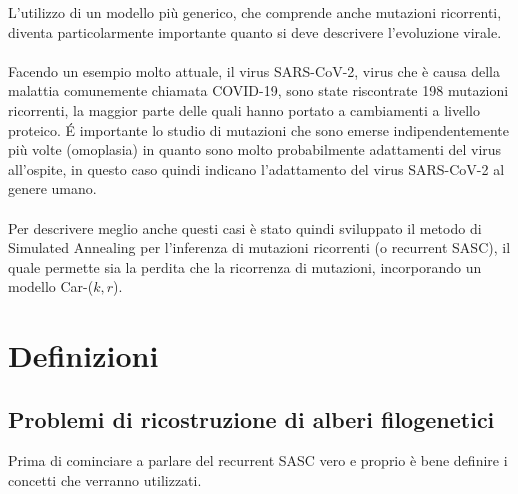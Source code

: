 \documentclass[12pt]{report}
\begin{document}
  L'utilizzo di un modello più generico, che comprende anche mutazioni ricorrenti, diventa particolarmente importante quanto si deve descrivere l'evoluzione virale.\\\\
  Facendo un esempio molto attuale, il virus SARS-CoV-2, virus che è causa della malattia comunemente chiamata COVID-19, sono state riscontrate 198 mutazioni ricorrenti, la maggior parte delle quali hanno portato a cambiamenti a livello proteico\cite{VANDORP2020104351}.
  \'E importante lo studio di mutazioni che sono emerse indipendentemente più volte (omoplasia) in quanto sono molto probabilmente adattamenti del virus all'ospite, in questo caso quindi indicano l'adattamento del virus SARS-CoV-2 al genere umano\cite{VANDORP2020104351}.\\\\
  Per descrivere meglio anche questi casi è stato quindi sviluppato il metodo di Simulated Annealing per l'inferenza di mutazioni ricorrenti (o recurrent SASC), il quale permette sia la perdita che la ricorrenza di mutazioni, incorporando un modello Car-($k, r$).

\chapter{Definizioni}

\section{Problemi di ricostruzione di alberi filogenetici}
  Prima di cominciare a parlare del recurrent SASC vero e proprio è bene definire i concetti che verranno utilizzati.\\
\end{document}
